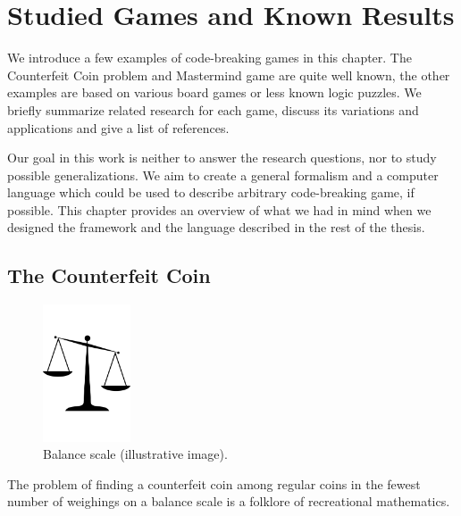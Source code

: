 \chapter{Studied Games and Known Results}
\label{ch:games}
We introduce a few examples of code-breaking games in this chapter.
The Counterfeit Coin problem and Mastermind game are quite well known,
  the other examples are based on various board games or less known
  logic puzzles.
We briefly summarize related research for each game, discuss
  its variations and applications and give a list of
  references.

Our goal in this work is neither to answer the research questions, nor
  to study possible generalizations.
We aim to create a general formalism and a computer language which could
  be used to describe arbitrary code-breaking game, if possible.
This chapter provides an overview of what we had in mind
  when we designed the framework and the language described
  in the rest of the thesis.

\section{The Counterfeit Coin} \label{s:coins}

\begin{figure}
  \begin{center}
  \vspace{-5mm}
  \includegraphics[width=0.23\textwidth]{pictures/scales.pdf}
  \vspace{-5mm}
  \end{center}
  \caption{Balance scale (illustrative image)\protect\footnotemark.}
  \vspace{-10mm}
\end{figure}

The problem of finding a counterfeit coin among regular coins in the fewest
  number of weighings on a balance scale is a folklore of
  recreational mathematics.

